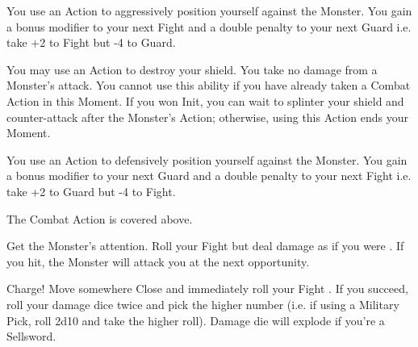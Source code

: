 {  You use an Action to aggressively position yourself against the Monster.  You gain a bonus modifier to your next Fight \RO and a double penalty to your next Guard \RO i.e. take +2 to Fight but -4 to Guard.


  You may use an Action to destroy your shield.  You take no  damage from a Monster's attack.  You cannot use this ability if you have already taken a Combat Action in this Moment.  If you won Init, you can wait to splinter your shield and counter-attack after the Monster's Action; otherwise, using this Action ends your Moment.


  You use an Action to defensively position yourself against the Monster.  You gain a bonus modifier to your next Guard \RO and a double penalty to your next Fight \RO i.e. take +2 to Guard but -4 to Fight.



  The  Combat Action is covered above.




  Get the Monster's attention.  Roll your Fight \RO but deal damage as if you were .   If you hit, the Monster will attack you at the next opportunity.


  Charge!  Move somewhere Close and immediately roll your Fight \RO. If you succeed, roll your damage dice twice and pick the higher number (i.e. if using a Military Pick, roll 2d10 and take the higher roll).  Damage die will explode if you're a Sellsword. 

}
